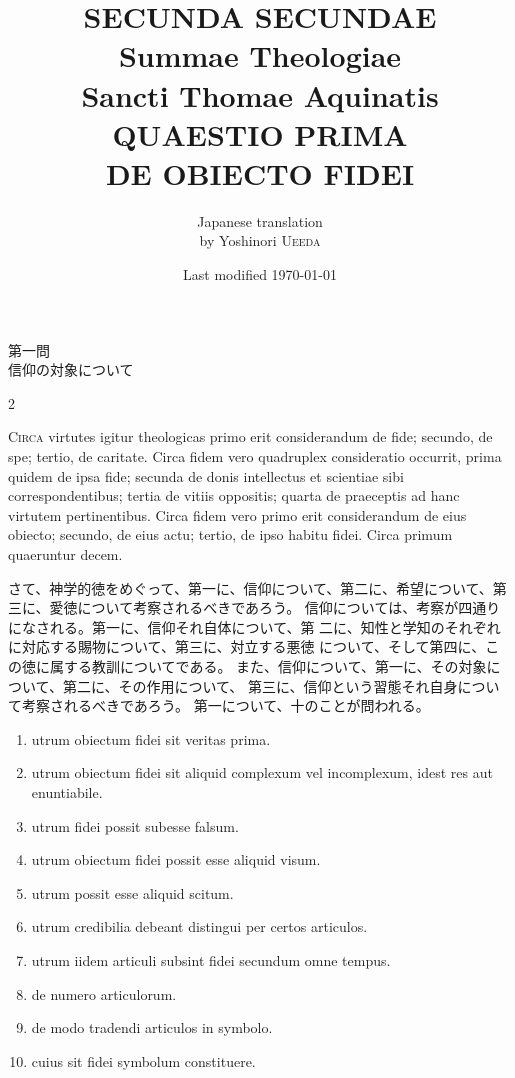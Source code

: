 \documentclass[paper=a4paper,fontsize=10pt,jafontsize=9pt,titlepage]{jlreq}
\title{{\bfseries SECUNDA SECUNDAE}\\{\Huge Summae Theologiae}\\Sancti Thomae
Aquinatis\\{\sffamily QUAESTIO PRIMA}\\DE OBIECTO FIDEI}
\author{Japanese translation\\by Yoshinori {\scshape Ueeda}}
\date{Last modified \today}
\begin{document}
\maketitle
\pagestyle{fancy}

\begin{center}
{\Large 第一問\\信仰の対象について}
\end{center}

\begin{paracol}{2}

{\huge C}{\scshape irca} virtutes igitur theologicas primo erit
 considerandum de fide; secundo, de spe; tertio, de caritate. Circa
 fidem vero quadruplex consideratio occurrit, prima quidem de ipsa fide;
 secunda de donis intellectus et scientiae sibi correspondentibus;
 tertia de vitiis oppositis; quarta de praeceptis ad hanc virtutem
 pertinentibus. Circa fidem vero primo erit considerandum de eius
 obiecto; secundo, de eius actu; tertio, de ipso habitu fidei. Circa
 primum quaeruntur decem.

\switchcolumn

さて、神学的徳をめぐって、第一に、信仰について、第二に、希望について、第
 三に、愛徳について考察されるべきであろう。
信仰については、考察が四通りになされる。第一に、信仰それ自体について、第
 二に、知性と学知のそれぞれに対応する賜物について、第三に、対立する悪徳
 について、そして第四に、この徳に属する教訓についてである。
また、信仰について、第一に、その対象について、第二に、その作用について、
 第三に、信仰という習態それ自身について考察されるべきであろう。
第一について、十のことが問われる。

\switchcolumn*

\begin{enumerate}
 \item utrum obiectum fidei sit veritas prima.
 \item utrum obiectum fidei sit aliquid complexum vel
 incomplexum, idest res aut enuntiabile.
 \item utrum fidei possit subesse falsum.
 \item utrum obiectum fidei possit esse aliquid
 visum.
 \item utrum possit esse aliquid scitum.
 \item utrum credibilia debeant distingui per certos articulos.
 \item utrum iidem articuli subsint fidei secundum omne tempus.
 \item de numero articulorum. 
 \item de modo tradendi articulos in symbolo. 
 \item cuius sit fidei symbolum constituere.
\end{enumerate}


\end{paracol}
\end{document}
